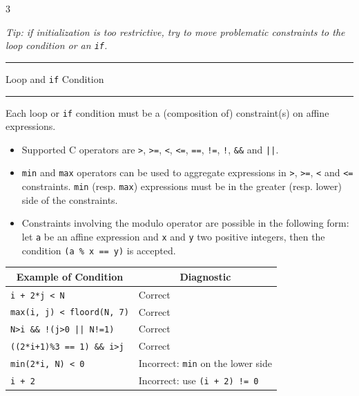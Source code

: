 \documentclass[landscape,a4paper]{article}
\def\titre#1{\begin{center}\hrule\vspace{0.1cm}#1
\vspace{0.07cm}\hrule\end{center}}
\begin{document}
\begin{multicols}{3}
\begin{small}
\vspace{0.3cm}
\textit{Tip: if initialization is too restrictive, try to move problematic
constraints to the loop condition or an {\tt if}.}
\end{small}

\titre{Loop and {\tt if} Condition}

\begin{small}
Each loop or {\tt if} condition must be a (composition of) constraint(s) on
affine expressions.
\begin{itemize} %
\item Supported C operators are {\tt >}, {\tt >=}, {\tt <}, {\tt <=},
      {\tt ==}, {\tt !=}, {\tt !}, {\tt \&\&} and {\tt ||}.
\item {\tt min} and {\tt max} operators can be used to aggregate expressions
      in {\tt >}, {\tt >=}, {\tt <} and {\tt <=} constraints. {\tt min}
      (resp. {\tt max}) expressions must be in the greater (resp. lower)
      side of the constraints.
\item Constraints involving the modulo operator are possible in the following
      form: let {\tt a} be an affine expression and {\tt x} and {\tt y} two
      positive integers, then the condition {\tt (a \% x == y)} is accepted.
\end{itemize}

\vspace{0.3cm}
\begin{tabular}{p{4cm}|p{4.39cm}}
\multicolumn{1}{c|}{Example of Condition} &\multicolumn{1}{c}{Diagnostic}\\
\hline
{\tt i + 2*j < N} & Correct\\
\hline
{\tt max(i, j) < floord(N, 7)} & Correct\\
\hline
{\tt N>i \&\& !(j>0 || N!=1)} & Correct\\
\hline
{\tt ((2*i+1)\%3 == 1) \&\& i>j} & Correct\\
\hline
\hline
{\tt min(2*i, N) < 0} & Incorrect: {\tt min} on the lower side\\
\hline
{\tt i + 2} & Incorrect: use {\tt (i + 2) != 0}\\
\end{tabular}


\end{small}
\end{multicols}
\end{document}
